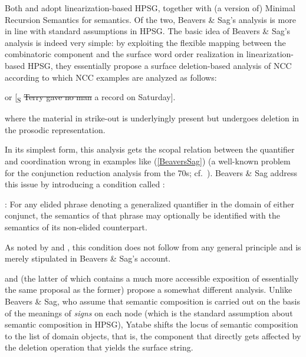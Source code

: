 \documentclass[output=paper
                ,modfonts
 	        ,biblatex
                ,babelshorthands
                ,newtxmath
                ,draftmode
                ,colorlinks, citecolor=brown
]{langscibook}
\begin{document}
Both \citet{BS2004a} and \citet{Yatabe2001a} adopt linearization-based HPSG, together
with (a version of) Minimal Recursion Semantics for
semantics. Of the two, Beavers \& Sag's
analysis is more in line with standard assumptions in HPSG. The basic
idea of Beavers \& Sag's analysis is indeed very simple: by exploiting the flexible
mapping between the combinatoric component and the surface word order
realization in linearization-based HPSG, they essentially propose a
surface deletion-based analysis of NCC according to which NCC examples
are analyzed as follows:

\begin{exe}
 \ex\label{BeaversSag} or
  [\textsubscript{S} \sout{Terry gave no man} a record on Saturday]. 
\end{exe}
where the material in strike-out is underlyingly present but undergoes
deletion in the prosodic representation.

In its simplest form, this analysis gets the scopal relation between
the quantifier and coordination wrong in examples like (\ref{BeaversSag}) (a
well-known problem for the conjunction reduction analysis from the
70s; cf.\ \citealt{partee70}). 
Beavers \& Sag address this issue by introducing a condition called
:

\begin{exe}
 \ex\label{OQM}
  : For any elided phrase 
  denoting a generalized quantifier in the 
  domain of either conjunct, the semantics of that phrase may
  optionally be identified with the semantics of its non-elided
  counterpart.
\end{exe}
As noted by \citet{levine11} and \citet[Section~3.2.1]{kubota-levine-coord}, this condition
does not follow from any general principle and is merely stipulated in
Beavers \& Sag's account.

\citet{Yatabe2001a} and \citet{yatabe-tam2017} (the latter of which contains a
much more accessible exposition of essentially the same proposal as
the former) propose a somewhat different analysis. Unlike Beavers \& Sag, who
assume that semantic composition is carried out on the basis of the
meanings of \emph{signs} on each node (which is the standard assumption
about semantic composition in HPSG), Yatabe shifts the locus of
semantic composition to the list of domain objects, that is, the
component that directly gets affected by the deletion operation that
yields the surface string.
\end{document}
